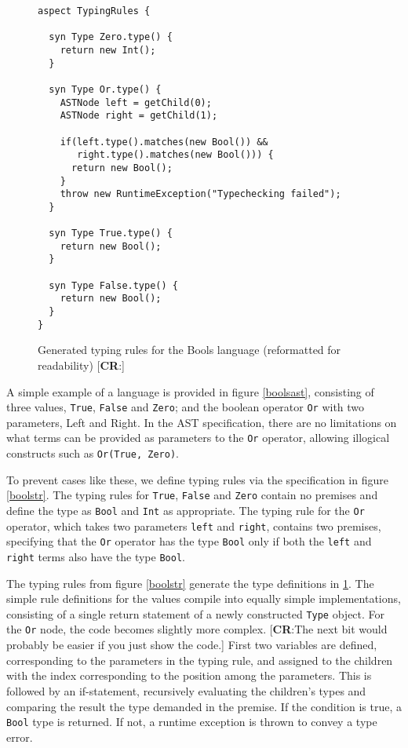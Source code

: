 \documentclass[nofilelist]{cslthse-msc}
\newcommand{\CR}[1]{\textcolor{green!60!black}{[\textbf{CR}:#1]}}
\begin{document}
\begin{figure}[h]
\begin{lstlisting}[language=jrag]
aspect TypingRules {

  syn Type Zero.type() {
    return new Int();
  }

  syn Type Or.type() {
    ASTNode left = getChild(0);
    ASTNode right = getChild(1);

    if(left.type().matches(new Bool()) &&
       right.type().matches(new Bool())) {
      return new Bool();
    }
    throw new RuntimeException("Typechecking failed");
  }

  syn Type True.type() {
    return new Bool();
  }

  syn Type False.type() {
    return new Bool();
  }
}
\end{lstlisting}
\caption{Generated typing rules for the Bools language (reformatted for readability)
\CR{}}
  \label{boolstrgen}
\end{figure}
A simple example of a language is provided in figure \ref{boolsast}, consisting of three values, \verb|True|, \verb|False| and \verb|Zero|; and the boolean operator \verb|Or| with two parameters, Left and Right.
In the AST specification, there are no limitations on what terms can be provided as parameters to the \verb|Or| operator, allowing illogical constructs such as \verb|Or(True, Zero)|.

To prevent cases like these, we define typing rules via the specification in figure \ref{boolstr}.
The typing rules for \verb|True|, \verb|False| and \verb|Zero| contain no premises and define the type as \verb|Bool| and \verb|Int| as appropriate.
The typing rule for the \verb|Or| operator, which takes two parameters \verb|left| and \verb|right|, contains two premises, specifying that the \verb|Or| operator has the type \verb|Bool| only if both the \verb|left| and \verb|right| terms also have the type \verb|Bool|.

The typing rules from figure \ref{boolstr} generate the type definitions in \ref{boolstrgen}.
The simple rule definitions for the values compile into equally simple implementations, consisting of a single return statement of a newly constructed \verb|Type| object.
For the \verb|Or| node, the code becomes slightly more complex.
\CR{The next bit would probably be easier if you just show the code.}
First two variables are defined, corresponding to the parameters in the typing rule, and assigned to the children with the index corresponding to the position among the parameters.
This is followed by an if-statement, recursively evaluating the children's types and comparing the result the type demanded in the premise.
If the condition is true, a \verb|Bool| type is returned.
If not, a runtime exception is thrown to convey a type error.
\end{document}
